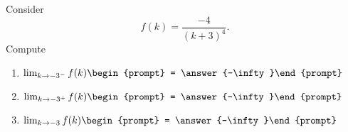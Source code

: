 \documentclass{ximera}
\author{Bart Snapp}
\begin{document}
\begin{exercise}
Consider 
\[
f(k) = \frac{-4}{(k+3)^4}.
\]
Compute
\begin{enumerate}
\item $\lim_{k\to -3^- } f(k) \begin{prompt} = \answer{-\infty}\end{prompt}$
\item $\lim_{k\to -3^+ } f(k) \begin{prompt} = \answer{-\infty}\end{prompt}$
\item $\lim_{k\to -3 } f(k) \begin{prompt} = \answer{-\infty}\end{prompt}$
\end{enumerate}
\end{exercise}
\end{document}
